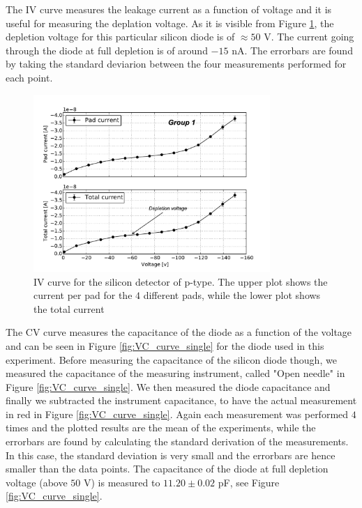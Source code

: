 \documentclass[12pt]{article}
\begin{document}
The IV curve measures the leakage current as a function of voltage and it is useful for measuring the deplation voltage. As it is visible from Figure \ref{fig:IVcurve}, the depletion voltage for this particular silicon diode is of $\approx 50$ V. The current going through the diode at full depletion is of around $-15$ nA. The errorbars are found by taking the standard deviarion between the four measurements performed for each point.

\begin{figure}[h!]
  \centering
  \includegraphics[width=0.8\textwidth]{./graphics/IV_V_vs_A.pdf}
  \caption{IV curve for the silicon detector of p-type. The upper plot shows the current per pad for the $4$ different pads, while the lower plot shows the total current }
  \label{fig:IVcurve}
\end{figure}

The CV curve measures the capacitance of the diode as a function of the voltage and can be seen in Figure \ref{fig:VC_curve_single} for the diode used in this experiment. Before measuring the capacitance of the silicon diode though, we measured the capacitance of the measuring instrument, called "Open needle" in Figure \ref{fig:VC_curve_single}. We then measured the diode capacitance and finally we subtracted the instrument capacitance, to have the actual measurement in red in Figure \ref{fig:VC_curve_single}. Again each measurement was performed $4$ times and the plotted results are the mean of the experiments, while the errorbars are found by calculating the standard derivation of the measurements. In this case, the standard deviation is very small and the errorbars are hence smaller than the data points. The capacitance of the diode at full depletion voltage (above $50$ V) is measured to $11.20 \pm 0.02$ pF, see Figure \ref{fig:VC_curve_single}.
\end{document}
